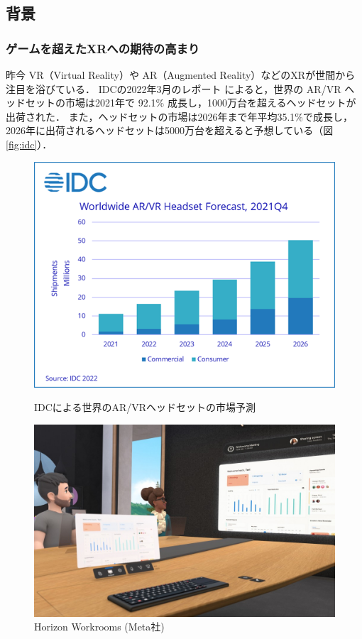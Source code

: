 \subsection{背景}

\subsubsection{ゲームを超えたXRへの期待の高まり}

昨今 VR（Virtual Reality）や AR（Augmented Reality）などのXRが世間から注目を浴びている．
IDCの2022年3月のレポート\cite{idc} によると，世界の AR/VR ヘッドセットの市場は2021年で
92.1\% 成長し，1000万台を超えるヘッドセットが出荷された．
また，ヘッドセットの市場は2026年まで年平均35.1\%で成長し，
2026年に出荷されるヘッドセットは5000万台を超えると予想している（図\ref{fig:idc}）．

\begin{figure}[htbp]
  \begin{minipage}[b]{0.50\linewidth}
    \centering
    \includegraphics[keepaspectratio, width=0.9\linewidth]{fig/idc.png}
    \caption{IDCによる世界のAR/VRヘッドセットの市場予測}
    \label{fig:idc}
  \end{minipage}
  \begin{minipage}[b]{0.50\linewidth}
    \centering
    \includegraphics[keepaspectratio, width=0.9\linewidth]{fig/workrooms.jpeg}
    \caption{Horizon Workrooms (Meta社)}
    \label{fig:workrooms}
  \end{minipage}
\end{figure}

